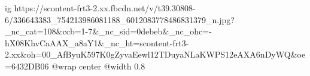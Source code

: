  
 
 
 
 

\ifcmt
  ig https://scontent-frt3-2.xx.fbcdn.net/v/t39.30808-6/336643383_754213986081188_6012083778486831379_n.jpg?_nc_cat=108&ccb=1-7&_nc_sid=0debeb&_nc_ohc=-hX08KhvCaAAX_a8aY1&_nc_ht=scontent-frt3-2.xx&oh=00_AfByuK597K0gZyvaEewl12TDuyaNLaKWPS12eAXA6nDyWQ&oe=6432DB06
  @wrap center
  @width 0.8
\fi
